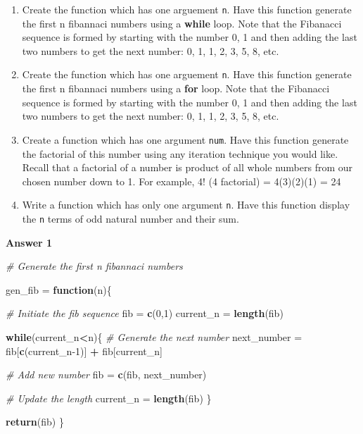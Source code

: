 \documentclass[
]{book}
\newenvironment{Shaded}{\begin{snugshade}}{\end{snugshade}}
\newcommand{\CommentTok}[1]{\textcolor[rgb]{0.56,0.35,0.01}{\textit{#1}}}
\newcommand{\ControlFlowTok}[1]{\textcolor[rgb]{0.13,0.29,0.53}{\textbf{#1}}}
\newcommand{\DecValTok}[1]{\textcolor[rgb]{0.00,0.00,0.81}{#1}}
\newcommand{\KeywordTok}[1]{\textcolor[rgb]{0.13,0.29,0.53}{\textbf{#1}}}
\newcommand{\NormalTok}[1]{#1}
\newcommand{\OperatorTok}[1]{\textcolor[rgb]{0.81,0.36,0.00}{\textbf{#1}}}
\newcommand{\StringTok}[1]{\textcolor[rgb]{0.31,0.60,0.02}{#1}}
\begin{document}
\begin{enumerate}
\def\labelenumi{\arabic{enumi})}
\item
  Create the function which has one arguement \texttt{n}. Have this function generate the first n fibannaci numbers using a \textbf{while} loop. Note that the Fibanacci sequence is formed by starting with the number 0, 1 and then adding the last two numbers to get the next number: 0, 1, 1, 2, 3, 5, 8, etc.
\item
  Create the function which has one arguement \texttt{n}. Have this function generate the first n fibannaci numbers using a \textbf{for} loop. Note that the Fibanacci sequence is formed by starting with the number 0, 1 and then adding the last two numbers to get the next number: 0, 1, 1, 2, 3, 5, 8, etc.
\item
  Create a function which has one argument \texttt{num}. Have this function generate the factorial of this number using any iteration technique you would like. Recall that a factorial of a number is product of all whole numbers from our chosen number down to 1. For example, 4! (4 factorial) = 4(3)(2)(1) = 24
\item
  Write a function which has only one argument \texttt{n}. Have this function display the \texttt{n} terms of odd natural number and their sum.
\end{enumerate}

\textbf{Answer 1}

\begin{Shaded}
\begin{Highlighting}[]
\CommentTok{# Generate the first n fibannaci numbers}

\NormalTok{gen_fib =}\StringTok{ }\ControlFlowTok{function}\NormalTok{(n)\{}

  \CommentTok{# Initiate the fib sequence }
\NormalTok{  fib =}\StringTok{ }\KeywordTok{c}\NormalTok{(}\DecValTok{0}\NormalTok{,}\DecValTok{1}\NormalTok{)}
\NormalTok{  current_n =}\StringTok{ }\KeywordTok{length}\NormalTok{(fib)}
  
  \ControlFlowTok{while}\NormalTok{(current_n}\OperatorTok{<}\NormalTok{n)\{}
    \CommentTok{# Generate the next number }
\NormalTok{    next_number =}\StringTok{ }\NormalTok{fib[}\KeywordTok{c}\NormalTok{(current_n}\DecValTok{-1}\NormalTok{)] }\OperatorTok{+}\StringTok{ }\NormalTok{fib[current_n]}
    
    \CommentTok{# Add new number }
\NormalTok{    fib =}\StringTok{ }\KeywordTok{c}\NormalTok{(fib, next_number)}
    
    \CommentTok{# Update the length }
\NormalTok{    current_n =}\StringTok{ }\KeywordTok{length}\NormalTok{(fib)}
\NormalTok{  \}}
  
  \KeywordTok{return}\NormalTok{(fib)}
\NormalTok{\}}
\end{Highlighting}
\end{Shaded}
\end{document}
